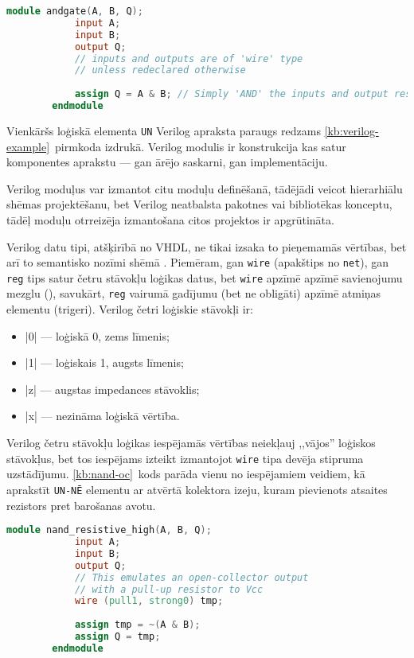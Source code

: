 	\begin{lstlisting}[language={Verilog},label=kb:verilog-example,gobble=4,%
			caption={Verilog apraksts loģiskajam \texttt{UN} elementam.}]
		module andgate(A, B, Q);
			input A;
			input B;
			output Q;
			// inputs and outputs are of 'wire' type
			// unless redeclared otherwise
			
			assign Q = A & B; // Simply 'AND' the inputs and output result
		endmodule
	\end{lstlisting}

	Vienkāršs loģiskā elementa \texttt{UN} Verilog apraksta paraugs redzams
	\ref{kb:verilog-example}~pirmkoda izdrukā.
	Verilog modulis ir konstrukcija kas satur komponentes aprakstu
	--- gan ārējo saskarni, gan implementāciju.
	
	Verilog moduļus var izmantot citu moduļu definēšanā, tādējādi veicot
	hierarhiālu shēmas projektēšanu, bet Verilog neatbalsta pakotnes vai
	bibliotēkas konceptu, tādēļ moduļu otrreizēja izmantošana citos projektos
	ir apgrūtināta.
	
	Verilog datu tipi, atšķirībā no VHDL, ne tikai izsaka
	to pieņemamās vērtības, bet arī to semantisko nozīmi shēmā
	\cite[21.~lpp.]{Vivek-Verilog}. Piemēram,
	gan \texttt{wire} (apakštips no \texttt{net}), gan \texttt{reg} tips
	satur četru stāvokļu loģikas datus, bet \texttt{wire} apzīmē
	apzīmē savienojumu mezglu (), savukārt, \texttt{reg}
	vairumā gadījumu (bet ne obligāti) apzīmē atmiņas elementu (trigeri).
	Verilog četri loģiskie stāvokļi ir:
	\begin{itemize}
		\item |0| --- loģiskā 0, zems līmenis;
		\item |1| --- loģiskais 1, augsts līmenis;
		\item |z| --- augstas impedances stāvoklis;
		\item |x| --- nezināma loģiskā vērtība.
	\end{itemize}
	
	Verilog četru stāvokļu loģikas iespējamās vērtības neiekļauj
	,,vājos'' loģiskos stāvokļus, bet tos iespējams izteikt izmantojot
	\texttt{wire} tipa devēja stipruma uzstādījumu. \ref{kb:nand-oc}~kods
	parāda vienu no iespējamiem veidiem, kā aprakstīt \texttt{UN-NĒ}
	elementu ar atvērtā kolektora izeju, kuram pievienots atsaites rezistors
	pret barošanas avotu.
	\begin{lstlisting}[language={Verilog},label=kb:nand-oc,gobble=4,%
			caption={Verilog pieraksta paraugs devēja stipruma uzstādījumam.}]
		module nand_resistive_high(A, B, Q);
			input A;
			input B;
			output Q;
			// This emulates an open-collector output
			// with a pull-up resistor to Vcc
			wire (pull1, strong0) tmp;
			
			assign tmp = ~(A & B);
			assign Q = tmp;
		endmodule
	\end{lstlisting}
	
